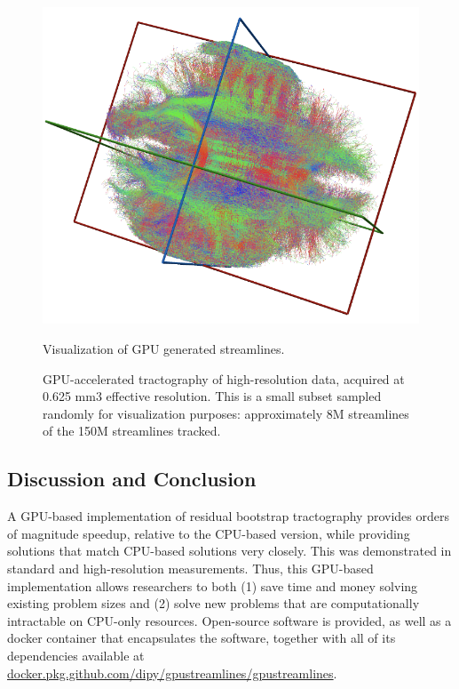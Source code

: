 \begin{figure}[htbp]
	\centering
	\includegraphics[width=\textwidth]{../figures/chapter2/streamlines.png}
	\caption{Visualization of GPU generated streamlines.}
	\caption*{GPU-accelerated tractography of high-resolution data, acquired at 0.625 mm3  effective resolution. This is a small subset sampled randomly for visualization purposes: approximately 8M streamlines of the 150M streamlines tracked.}
	\label{fig:gpu_streamlines}
\end{figure}

\subsection{Discussion and Conclusion} 
A GPU-based implementation of residual bootstrap tractography provides orders of magnitude speedup, relative to the CPU-based version, while providing solutions that match CPU-based solutions very closely. This was demonstrated in standard and high-resolution measurements. Thus, this GPU-based implementation allows
researchers to both (1) save time and money solving existing problem
sizes and (2) solve new problems that are computationally intractable on
CPU-only resources. Open-source software is provided, as well as a
docker container that encapsulates the software, together with all of
its dependencies available at
\url{docker.pkg.github.com/dipy/gpustreamlines/gpustreamlines}.
